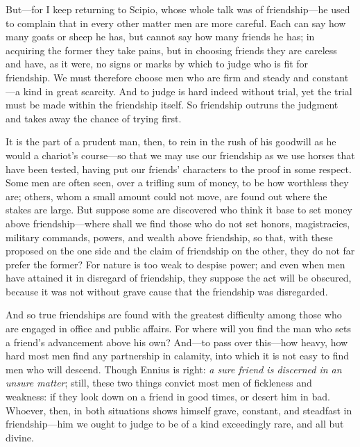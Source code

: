  But—for I keep returning to Scipio, whose whole talk was of friendship—he used to complain that in every other matter men are more careful. Each can say how many goats or sheep he has, but cannot say how many friends he has; in acquiring the former they take pains, but in choosing friends they are careless and have, as it were, no signs or marks by which to judge who is fit for friendship. We must therefore choose men who are firm and steady and constant—a kind in great scarcity. And to judge is hard indeed without trial, yet the trial must be made within the friendship itself. So friendship outruns the judgment and takes away the chance of trying first.

 It is the part of a prudent man, then, to rein in the rush of his goodwill as he would a chariot's course—so that we may use our friendship as we use horses that have been tested, having put our friends' characters to the proof in some respect. Some men are often seen, over a trifling sum of money, to be how worthless they are; others, whom a small amount could not move, are found out where the stakes are large. But suppose some are discovered who think it base to set money above friendship—where shall we find those who do not set honors, magistracies, military commands, powers, and wealth above friendship, so that, with these proposed on the one side and the claim of friendship on the other, they do not far prefer the former? For nature is too weak to despise power; and even when men have attained it in disregard of friendship, they suppose the act will be obscured, because it was not without grave cause that the friendship was disregarded.

 And so true friendships are found with the greatest difficulty among those who are engaged in office and public affairs. For where will you find the man who sets a friend's advancement above his own? And—to pass over this—how heavy, how hard most men find any partnership in calamity, into which it is not easy to find men who will descend. Though Ennius is right: \textit{a sure friend is discerned in an unsure matter}; still, these two things convict most men of fickleness and weakness: if they look down on a friend in good times, or desert him in bad. Whoever, then, in both situations shows himself grave, constant, and steadfast in friendship—him we ought to judge to be of a kind exceedingly rare, and all but divine.

